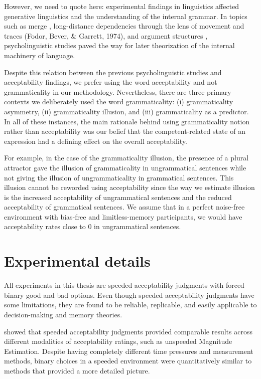 However, we need to quote  here: experimental findings in linguistics affected generative linguistics and the understanding of the internal grammar. In topics such as merge \citep{Levelt74}, long-distance dependencies through the lens of movement and traces (Fodor, Bever, \& Garrett, 1974), and argument structures \citep{Pinker1989}, psycholinguistic studies paved the way for later theorization of the internal machinery of language.

Despite this relation between the previous psycholinguistic studies and acceptability findings, we prefer using the word acceptability and not grammaticality in our methodology. Nevertheless, there are three primary contexts we deliberately used the word grammaticality: (i) grammaticality asymmetry, (ii) grammaticality illusion, and (iii) grammaticality as a predictor. In all of these instances, the main rationale behind using grammaticality notion rather than acceptability was our belief that the competent-related state of an expression had a defining effect on the overall acceptability. 

For example, in the case of the grammaticality illusion, the presence of a plural attractor gave the illusion of grammaticality in ungrammatical sentences while not giving the illusion of ungrammaticality in grammatical sentences. This illusion cannot be reworded using acceptability since the way we estimate illusion is the increased acceptability of ungrammatical sentences and the reduced acceptability of grammatical sentences. We assume that in a perfect noise-free environment with bias-free and limitless-memory participants, we would have acceptability rates close to 0 in ungrammatical sentences.  

\section{Experimental details}

All experiments in this thesis are speeded acceptability judgments with forced binary good and bad options. Even though speeded acceptability judgments have some limitations, they are found to be reliable, replicable, and easily applicable to decision-making and memory theories. 

 showed that speeded acceptability judgments provided comparable results across different modalities of acceptability ratings, such as unspeeded Magnitude Estimation. Despite having completely different time pressures and measurement methods, binary choices in a speeded environment were quantitatively similar to methods that provided a more detailed picture.

